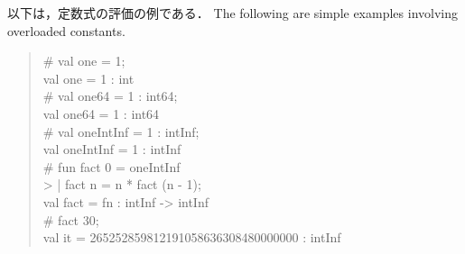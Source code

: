 \documentclass{jbook}
\newcommand{\txt}[2]{#2}
\newcommand{\code}[1]{\mbox{\large\tt #1}}
\newcommand{\nonterm}[1]{\mbox{$\langle$}{\it #1}\mbox{$\rangle$}}
\newenvironment{program}{\begin{quote}\begin{tt}}%
                        {\end{tt}\end{quote}}
\begin{document}
\ifjp%
	以下は，定数式の評価の例である．
\else%
	The following are simple examples involving overloaded constants.
\fi%
\begin{program}
\# val one = 1;\\
val one = 1 : int\\
\# val one64 = 1 : int64;\\
val one64 = 1 : int64\\
\# val oneIntInf = 1 : intInf;\\
val oneIntInf = 1 : intInf\\
\# fun fact 0 = oneIntInf\\
>   | fact n = n * fact (n - 1);\\
val fact = fn : intInf -> intInf\\
\# fact 30;\\
val it = 265252859812191058636308480000000 : intInf
\end{program}


% 
% 
\end{document}
